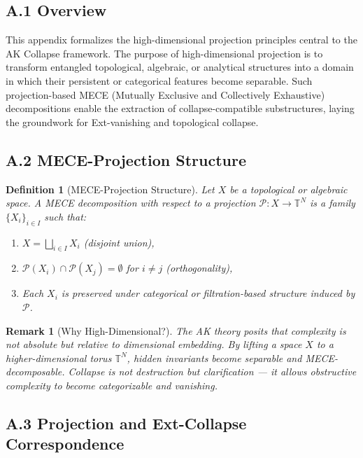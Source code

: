 \documentclass[11pt]{article}
\newtheorem{definition}[theorem]{Definition}
\newtheorem{remark}[theorem]{Remark}
\begin{document}
\subsection*{A.1 Overview}

This appendix formalizes the high-dimensional projection principles central to the AK Collapse framework. The purpose of high-dimensional projection is to transform entangled topological, algebraic, or analytical structures into a domain in which their persistent or categorical features become separable.  
Such projection-based MECE (Mutually Exclusive and Collectively Exhaustive) decompositions enable the extraction of collapse-compatible substructures, laying the groundwork for Ext-vanishing and topological collapse.



\subsection*{A.2 MECE-Projection Structure}

\begin{definition}[MECE-Projection Structure]
Let $X$ be a topological or algebraic space. A MECE decomposition with respect to a projection $\mathcal{P}: X \to \mathbb{T}^N$ is a family $\{X_i\}_{i \in I}$ such that:
\begin{enumerate}
  \item $X = \bigsqcup_{i \in I} X_i$ (disjoint union),
  \item $\mathcal{P}(X_i) \cap \mathcal{P}(X_j) = \emptyset$ for $i \ne j$ (orthogonality),
  \item Each $X_i$ is preserved under categorical or filtration-based structure induced by $\mathcal{P}$.
\end{enumerate}
\end{definition}

\begin{remark}[Why High-Dimensional?]
The AK theory posits that complexity is not absolute but relative to dimensional embedding.  
By lifting a space $X$ to a higher-dimensional torus $\mathbb{T}^N$, hidden invariants become separable and MECE-decomposable.  
Collapse is not destruction but clarification — it allows obstructive complexity to become categorizable and vanishing.
\end{remark}



\subsection*{A.3 Projection and Ext-Collapse Correspondence}
\end{document}
